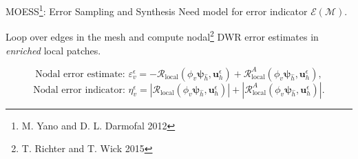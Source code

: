 \documentclass{beamer}
\newcounter{sectionframecount}
\begin{document}
\begin{frame}[t]{MOESS\footnote{M. Yano and D. L. Darmofal 2012}: Error Sampling and Synthesis}
\vspace{-12pt}
Need model for error indicator $\mathcal{E}(\mathcal{M})$.

Loop over edges in the mesh and compute nodal\footnote{T. Richter and T. Wick 2015} DWR error estimates in \textit{enriched} local patches.


\vspace{3.1cm}
\begin{equation}
  \text{Nodal error estimate: }\varepsilon_v^\epsilon = -\mathcal{R}_\text{local}(\phi_v \boldsymbol{\psi}_{\hat{h}},\boldsymbol{u}_h^\epsilon) + \mathcal{R}_\text{local}^A(\phi_v\boldsymbol{\psi}_{\hat{h}},\boldsymbol{u}^\epsilon_h),
  \label{e:dwr_est_base_local}
\end{equation}
\vspace{-10pt}
\begin{equation}
  \text{Nodal error indicator: }\eta_v^\epsilon = |\mathcal{R}_\text{local}(\phi_v \boldsymbol{\psi}_{\hat{h}},\boldsymbol{u}_h^\epsilon)| + |\mathcal{R}_\text{local}^A(\phi_v\boldsymbol{\psi}_{\hat{h}},\boldsymbol{u}^\epsilon_h)|.
  \label{e:dwr_ind_base_local}
\end{equation}

\end{frame}

\end{document}
